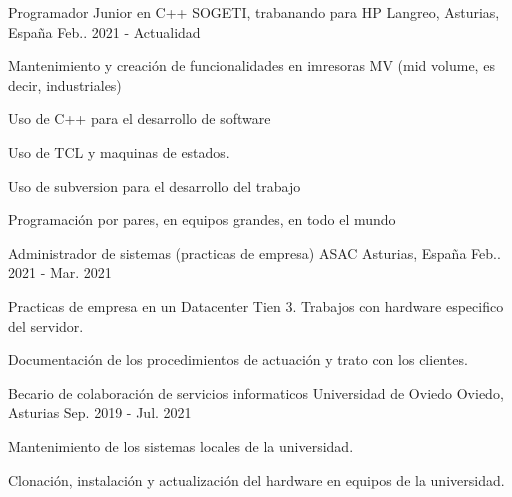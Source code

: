 

\begin{cventries}

  \cventry
    {Programador Junior en C++} %
    {SOGETI, trabanando para HP} %
    {Langreo, Asturias, España} %
    {Feb.. 2021 - Actualidad} %
    {
      \begin{cvitems} %
        \item {Mantenimiento y creación de funcionalidades en imresoras MV (mid volume, es decir, industriales)}
        \item {Uso de C++ para el desarrollo de software}
        \item {Uso de TCL y maquinas de estados.}
        \item {Uso de subversion para el desarrollo del trabajo}
        \item {Programación por pares, en equipos grandes, en todo el mundo}
      \end{cvitems}
    }

  \cventry
    {Administrador de sistemas (practicas de empresa)} %
    {ASAC} %
    {Asturias, España} %
    {Feb.. 2021 - Mar. 2021} %
    {
      \begin{cvitems} %
        \item {Practicas de empresa en un Datacenter Tien 3. Trabajos con hardware especifico del servidor.}
        \item {Documentación de los procedimientos de actuación y trato con los clientes.}
      \end{cvitems}
    }

  \cventry
    {Becario de colaboración de servicios informaticos} %
    {Universidad de Oviedo} %
    {Oviedo, Asturias} %
    {Sep. 2019 - Jul. 2021} %
    {
      \begin{cvitems} %
        \item {Mantenimiento de los sistemas locales de la universidad.}
        \item {Clonación, instalación y actualización del hardware en equipos de la universidad.}
      \end{cvitems}
    }

\end{cventries}
